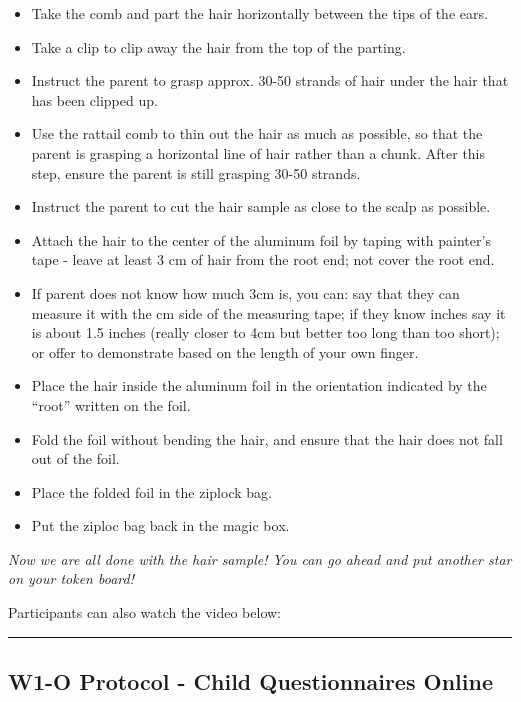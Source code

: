 \documentclass[
]{book}
\providecommand{\tightlist}{%
  \setlength{\itemsep}{0pt}\setlength{\parskip}{0pt}}
\begin{document}
\begin{itemize}
\tightlist
\item
  Take the comb and part the hair horizontally between the tips of the ears.
\item
  Take a clip to clip away the hair from the top of the parting.
\item
  Instruct the parent to grasp approx. 30-50 strands of hair under the hair that has been clipped up.
\item
  Use the rattail comb to thin out the hair as much as possible, so that the parent is grasping a horizontal line of hair rather than a chunk. After this step, ensure the parent is still grasping 30-50 strands.
\item
  Instruct the parent to cut the hair sample as close to the scalp as possible.
\item
  Attach the hair to the center of the aluminum foil by taping with painter's tape - leave at least 3 cm of hair from the root end; not cover the root end.
\item
  If parent does not know how much 3cm is, you can: say that they can measure it with the cm side of the measuring tape; if they know inches say it is about 1.5 inches (really closer to 4cm but better too long than too short); or offer to demonstrate based on the length of your own finger.
\item
  Place the hair inside the aluminum foil in the orientation indicated by the ``root'' written on the foil.
\item
  Fold the foil without bending the hair, and ensure that the hair does not fall out of the foil.
\item
  Place the folded foil in the ziplock bag.
\item
  Put the ziploc bag back in the magic box.
\end{itemize}

\emph{Now we are all done with the hair sample! You can go ahead and put another star on your token board!}

Participants can also watch the video below:

\begin{center}\rule{0.5\linewidth}{0.5pt}\end{center}

\hypertarget{w1-o-protocol---child-questionnaires-online}{%
\subsection{W1-O Protocol - Child Questionnaires Online}\label{w1-o-protocol---child-questionnaires-online}}
\end{document}
